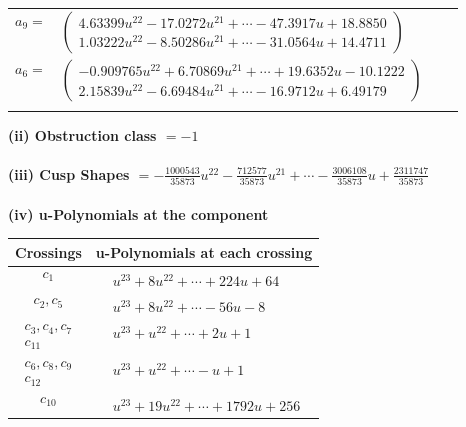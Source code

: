 \documentclass[1p]{elsarticle_modified}
\theoremstyle{definition}
\begin{document}
\begin{tabular}{m{7pt} m{180pt} m{7pt} m{180pt} }
\flushright $a_{9}=$&$\begin{pmatrix}4.63399 u^{22}-17.0272 u^{21}+\cdots-47.3917 u+18.8850\\1.03222 u^{22}-8.50286 u^{21}+\cdots-31.0564 u+14.4711\end{pmatrix}$ \\
\flushright $a_{6}=$&$\begin{pmatrix}-0.909765 u^{22}+6.70869 u^{21}+\cdots+19.6352 u-10.1222\\2.15839 u^{22}-6.69484 u^{21}+\cdots-16.9712 u+6.49179\end{pmatrix}$\\&\end{tabular}
\flushleft \textbf{(ii) Obstruction class $= -1$}\\~\\
\flushleft \textbf{(iii) Cusp Shapes $= -\frac{1000543}{35873} u^{22}-\frac{712577}{35873} u^{21}+\cdots-\frac{3006108}{35873} u+\frac{2311747}{35873}$}\\~\\
\newpage\renewcommand{\arraystretch}{1}
\flushleft \textbf{(iv) u-Polynomials at the component}\newline \\
\begin{tabular}{m{50pt}|m{274pt}}
Crossings & \hspace{64pt}u-Polynomials at each crossing \\
\hline $$\begin{aligned}c_{1}\end{aligned}$$&$\begin{aligned}
&u^{23}+8 u^{22}+\cdots+224 u+64
\end{aligned}$\\
\hline $$\begin{aligned}c_{2},c_{5}\end{aligned}$$&$\begin{aligned}
&u^{23}+8 u^{22}+\cdots-56 u-8
\end{aligned}$\\
\hline $$\begin{aligned}c_{3},c_{4},c_{7}\\c_{11}\end{aligned}$$&$\begin{aligned}
&u^{23}+u^{22}+\cdots+2 u+1
\end{aligned}$\\
\hline $$\begin{aligned}c_{6},c_{8},c_{9}\\c_{12}\end{aligned}$$&$\begin{aligned}
&u^{23}+u^{22}+\cdots- u+1
\end{aligned}$\\
\hline $$\begin{aligned}c_{10}\end{aligned}$$&$\begin{aligned}
&u^{23}+19 u^{22}+\cdots+1792 u+256
\end{aligned}$\\
\hline
\end{tabular}\\~\\
\end{document}
